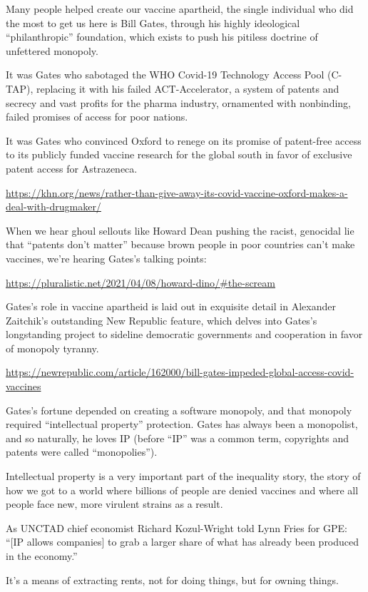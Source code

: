 \documentclass[
]{book}
\begin{document}
Many people helped create our vaccine apartheid, the single individual who did the most to get us here is Bill Gates, through his highly ideological ``philanthropic'' foundation, which exists to push his pitiless doctrine of unfettered monopoly.

It was Gates who sabotaged the WHO Covid-19 Technology Access Pool (C-TAP), replacing it with his failed ACT-Accelerator, a system of patents and secrecy and vast profits for the pharma industry, ornamented with nonbinding, failed promises of access for poor nations.

It was Gates who convinced Oxford to renege on its promise of patent-free access to its publicly funded vaccine research for the global south in favor of exclusive patent access for Astrazeneca.

\url{https://khn.org/news/rather-than-give-away-its-covid-vaccine-oxford-makes-a-deal-with-drugmaker/}

When we hear ghoul sellouts like Howard Dean pushing the racist, genocidal lie that ``patents don't matter'' because brown people in poor countries can't make vaccines, we're hearing Gates's talking points:

\url{https://pluralistic.net/2021/04/08/howard-dino/\#the-scream}

Gates's role in vaccine apartheid is laid out in exquisite detail in Alexander Zaitchik's outstanding New Republic feature, which delves into Gates's longstanding project to sideline democratic governments and cooperation in favor of monopoly tyranny.

\url{https://newrepublic.com/article/162000/bill-gates-impeded-global-access-covid-vaccines}

Gates's fortune depended on creating a software monopoly, and that monopoly required ``intellectual property'' protection. Gates has always been a monopolist, and so naturally, he loves IP (before ``IP'' was a common term, copyrights and patents were called ``monopolies'').

Intellectual property is a very important part of the inequality story, the story of how we got to a world where billions of people are denied vaccines and where all people face new, more virulent strains as a result.

As UNCTAD chief economist Richard Kozul-Wright told Lynn Fries for GPE: ``{[}IP allows companies{]} to grab a larger share of what has already been produced in the economy.''

It's a means of extracting rents, not for doing things, but for owning things.
\end{document}
